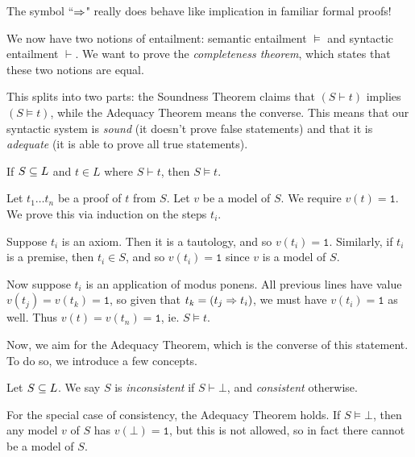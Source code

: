 \documentclass{article}
\begin{document}
\begin{corollary}
	The symbol ``$\Rightarrow$" really does behave like implication in familiar formal proofs!
\end{corollary}

We now have two notions of entailment: semantic entailment $\vDash$ and syntactic entailment $\vdash$. We want to prove the \textit{completeness theorem}, which states that these two notions are equal.

This splits into two parts: the Soundness Theorem claims that $(S \vdash t)$ implies $(S \vDash t)$, while the Adequacy Theorem means the converse. This means that our syntactic system is \textit{sound} (it doesn't prove false statements) and that it is \textit{adequate} (it is able to prove all true statements).

\begin{theorem}
	\label{soundness-theorem}
    If $S \subseteq L$ and $t \in L$ where $S \vdash t$, then $S \vDash t$.
\end{theorem}

\begin{prf}
    Let $t_1 \dots t_n$ be a proof of $t$ from $S$. Let $v$ be a model of $S$. We require $v(t) = \texttt{1}$. We prove this via induction on the steps $t_i$.
    
	Suppose $t_i$ is an axiom. Then it is a tautology, and so $v(t_i) = \texttt{1}$. Similarly, if $t_i$ is a premise, then $t_i \in S$, and so $v(t_i) = \texttt{1}$ since $v$ is a model of $S$.
	
	Now suppose $t_i$ is an application of modus ponens. All previous lines have value $v(t_j) = v(t_k) = \texttt{1}$, so given that $t_k = (t_j \Rightarrow t_i)$, we must have $v(t_i) = \texttt{1}$ as well. Thus $v(t) = v(t_n) = \texttt{1}$, ie. $S \vDash t$.
\end{prf}

Now, we aim for the Adequacy Theorem, which is the converse of this statement. To do so, we introduce a few concepts.

\begin{definition}[Consistency]
    Let $S \subseteq L$. We say $S$ is \textit{inconsistent} if $S \vdash \bot$, and \textit{consistent} otherwise.
\end{definition}

\begin{corollary}
    For the special case of consistency, the Adequacy Theorem holds. If $S \vDash \bot$, then any model $v$ of $S$ has $v(\bot) = \texttt{1}$, but this is not allowed, so in fact there cannot be a model of $S$.
\end{corollary}
\end{document}
